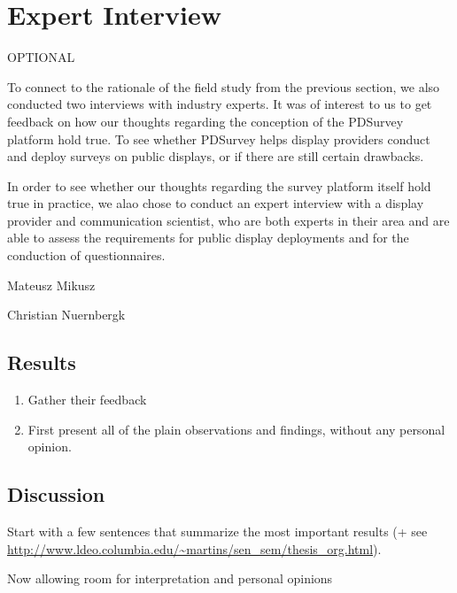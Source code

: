 \section{Expert Interview}
\label{sec:expert-interview}

OPTIONAL

To connect to the rationale of the field study from the previous section, we also conducted two interviews with industry experts. It was of interest to us to get feedback on how our thoughts regarding the conception of the PDSurvey platform hold true. To see whether PDSurvey helps display providers conduct and deploy surveys on public displays, or if there are still certain drawbacks.

In order to see whether our thoughts regarding the survey platform itself hold true in practice, we alao chose to conduct an expert interview with a display provider and communication scientist, who are both experts in their area and are able to assess the requirements for public display deployments and for the conduction of questionnaires.


Mateusz Mikusz


Christian Nuernbergk



\subsection{Results}

	\begin{enumerate}
	\item Gather their feedback
	\item First present all of the plain observations and findings, without any personal opinion.
	\end{enumerate}



\subsection{Discussion}

	Start with a few sentences that summarize the most important results (+ see \url{http://www.ldeo.columbia.edu/~martins/sen_sem/thesis_org.html}).

	Now allowing room for interpretation and personal opinions

